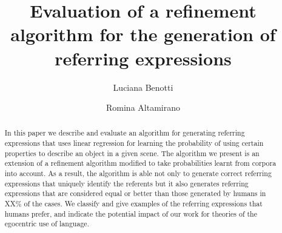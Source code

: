 \documentclass{llncs}
\begin{document}
\mainmatter              %
%
\title{Evaluation of a refinement algorithm for the generation of referring expressions}
%
%
\author{Luciana Benotti \and Romina Altamirano}
%
%

\maketitle              %

\begin{abstract}
In this paper we describe and evaluate an algorithm for generating referring expressions that uses linear regression for learning the probability of using certain properties to describe an object in a given scene. The  algorithm we present is an extension of a refinement algorithm modified to take probabilities learnt from corpora into account. As a result, the algorithm is able not only to generate correct referring expressions that uniquely identify the referents but it also generates referring expressions that are considered equal or better than those generated by humans in XX\%  of the cases. We classify and give examples of the referring expressions that humans prefer, and indicate the potential impact of our work for theories of the egocentric use of language. 
\end{abstract}
%



%






\end{document}
